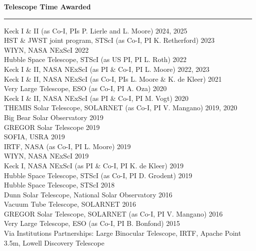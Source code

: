 \documentclass[12pt]{report}
\begin{document}
\noindent\bf{Telescope Time Awarded}\rm \hspace*{\fill} \\
\rule{\textwidth}{1pt}
Keck I \& II (as Co-I, PIs P. Lierle and L. Moore) \hfill 2024, 2025\\
HST \& JWST joint program, STScI (as Co-I, PI K. Retherford) \hfill 2023\\
WIYN, NASA NExScI \hfill 2022\\
Hubble Space Telescope, STScI (as US PI, PI L. Roth) \hfill 2022\\
Keck I \& II, NASA NExScI (as PI \& Co-I, PI L. Moore) \hfill 2022, 2023\\
Keck I \& II, NASA NExScI (as Co-I, PIs L. Moore \& K. de Kleer) \hfill 2021\\
Very Large Telescope, ESO (as Co-I, PI A. Oza) \hfill 2020\\
Keck I \& II, NASA NExScI  (as PI \& Co-I, PI M. Vogt) \hfill 2020\\
THEMIS Solar Telescope, SOLARNET (as Co-I, PI V. Mangano) \hfill 2019, 2020\\
Big Bear Solar Observatory \hfill 2019\\
GREGOR Solar Telescope \hfill 2019\\
SOFIA, USRA \hfill 2019\\
IRTF, NASA (as Co-I, PI L. Moore) \hfill 2019\\
WIYN, NASA NExScI \hfill 2019\\
Keck I, NASA NExScI (as PI \& Co-I, PI K. de Kleer) \hfill 2019\\
Hubble Space Telescope, STScI (as Co-I, PI D. Grodent) \hfill 2019\\
Hubble Space Telescope, STScI \hfill 2018\\
Dunn Solar Telescope, National Solar Observatory \hfill 2016\\
Vacuum Tube Telescope, SOLARNET \hfill 2016\\
GREGOR Solar Telescope, SOLARNET (as Co-I, PI V. Mangano) \hfill 2016\\
Very Large Telescope, ESO (as Co-I, PI B. Bonfond) \hfill 2015\\
Via Institutions Partnerships: Large Binocular Telescope, IRTF, Apache Point 3.5m, Lowell Discovery Telescope\\
\end{document}
